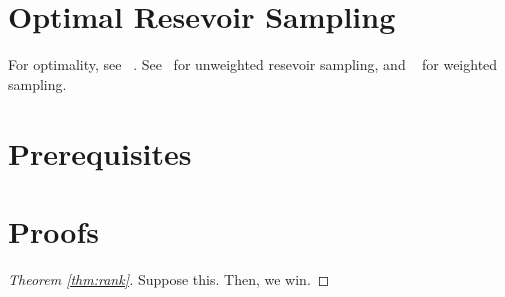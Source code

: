 \documentclass{article}
\begin{document}
\section{Optimal Resevoir Sampling}
\label{sec:resevoir}

For optimality, see ~\cite{vitter85-03}.
See~\cite{li94-12} for unweighted resevoir sampling, and ~\cite{efraimidis06-03} for weighted sampling.

\section{Prerequisites}
\label{sec:prereq}

\section{Proofs}
\label{sec:proofs}

\begin{proof}[Theorem \ref{thm:rank}]
	Suppose this.
	Then, we win.
\end{proof}

\printbibliography
\end{document}
